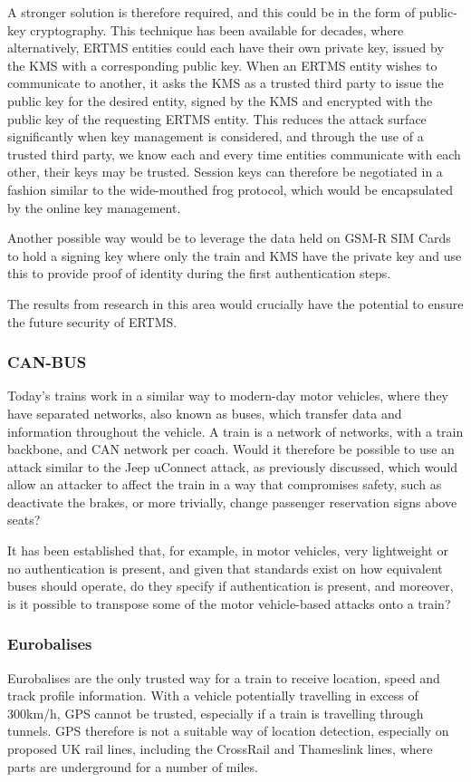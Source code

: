 \documentclass[twoside,11pt,a4paper]{article}
\begin{document}
A stronger solution is therefore required, and this could be in the form of public-key cryptography. This technique has been available for decades, where alternatively, ERTMS entities could each have their own private key, issued by the KMS with a corresponding public key. When an ERTMS entity wishes to communicate to another, it asks the KMS as a trusted third party to issue the public key for the desired entity, signed by the KMS and encrypted with the public key of the requesting ERTMS entity. This reduces the attack surface significantly when key management is considered, and through the use of a trusted third party, we know each and every time entities communicate with each other, their keys may be trusted. Session keys can therefore be negotiated in a fashion similar to the wide-mouthed frog protocol, which would be encapsulated by the online key management.

Another possible way would be to leverage the data held on GSM-R SIM Cards to hold a signing key where only the train and KMS have the private key and use this to provide proof of identity during the first authentication steps.

The results from research in this area would crucially have the potential to ensure the future security of ERTMS.

\subsubsection{CAN-BUS}
Today's trains work in a similar way to modern-day motor vehicles, where they have separated networks, also known as buses, which transfer data and information throughout the vehicle. A train is a network of networks, with a train backbone, and CAN network per coach. Would it therefore be possible to use an attack similar to the Jeep uConnect attack, as previously discussed, which would allow an attacker to affect the train in a way that compromises safety, such as deactivate the brakes, or more trivially, change passenger reservation signs above seats?

It has been established that, for example, in motor vehicles, very lightweight or no authentication is present, and given that standards exist on how equivalent buses should operate, do they specify if authentication is present, and moreover, is it possible to transpose some of the motor vehicle-based attacks onto a train?

\subsubsection{Eurobalises}
Eurobalises are the only trusted way for a train to receive location, speed and track profile information. With a vehicle potentially travelling in excess of 300km/h, GPS cannot be trusted, especially if a train is travelling through tunnels. GPS therefore is not a suitable way of location detection, especially on proposed UK rail lines, including the CrossRail and Thameslink lines, where parts are underground for a number of miles.
\end{document}
